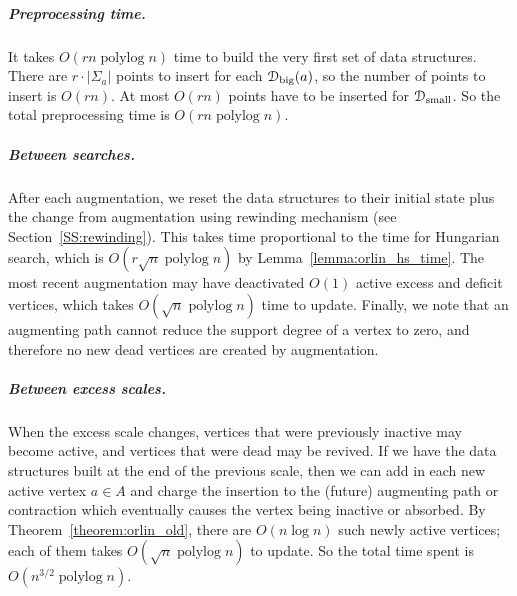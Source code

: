 \documentclass[a4paper,UKenglish]{socg-lipics-v2018}
\def\polylog{\mathop{\mathrm{polylog}}}
\def\abs#1{\mathopen| #1 \mathclose|}		%
\theoremstyle{plain}
\numberwithin{figure}{section}
\renewcommand{\paragraph}{\subparagraph}
\begin{document}
\paragraph{Preprocessing time.}
It takes $O(rn\polylog n)$ time to build the very first set of data structures.
There are $r \cdot \abs{\Sigma_a}$ points to insert for each $\EuScript{D}_\text{big}(a)$,
so the number of points to insert is $O(rn)$.
At most $O(rn)$ points have to be inserted for $\EuScript{D}_\text{small}$.
So the total preprocessing time is $O(rn\polylog n)$.

\paragraph{Between searches.}
After each augmentation, we reset the data structures to their initial
state plus the change from augmentation using rewinding mechanism (see Section~\ref{SS:rewinding}).
This takes time proportional to the time for Hungarian search,
which is $O(r\sqrt{n}\polylog n)$ by Lemma~\ref{lemma:orlin_hs_time}.
The most recent augmentation may have deactivated $O(1)$ active excess and deficit vertices, which takes
$O(\sqrt{n}\polylog n)$ time to update.
Finally, we note that an augmenting path cannot reduce the support degree of
a vertex to zero, and therefore no new dead vertices are created by augmentation.

\paragraph{Between excess scales.}
When the excess scale changes, vertices that were previously inactive may
become active, and vertices that were dead may be revived.
If we have the data structures built at the end of the
previous scale, then we can add in each new active vertex $a \in A$ and
charge the insertion to the (future) augmenting path or contraction which
eventually causes the vertex being inactive or absorbed.
By Theorem~\ref{theorem:orlin_old}, there are $O(n\log n)$ such newly active
vertices; each of them takes $O(\sqrt{n}\polylog n)$ to update.
So the total time spent is $O(n^{3/2}\polylog n)$.
\end{document}

